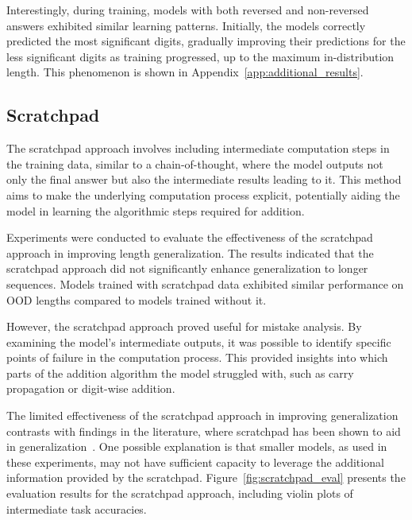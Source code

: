 Interestingly, during training, models with both reversed and non-reversed answers exhibited similar learning patterns. Initially, the models correctly predicted the most significant digits, gradually improving their predictions for the less significant digits as training progressed, up to the maximum in-distribution length. This phenomenon is shown in Appendix~\ref{app:additional_results}.

\subsection{Scratchpad}

The scratchpad approach involves including intermediate computation steps in the training data, similar to a chain-of-thought, where the model outputs not only the final answer but also the intermediate results leading to it. This method aims to make the underlying computation process explicit, potentially aiding the model in learning the algorithmic steps required for addition.

Experiments were conducted to evaluate the effectiveness of the scratchpad approach in improving length generalization. The results indicated that the scratchpad approach did not significantly enhance generalization to longer sequences. Models trained with scratchpad data exhibited similar performance on OOD lengths compared to models trained without it.

However, the scratchpad approach proved useful for mistake analysis. By examining the model's intermediate outputs, it was possible to identify specific points of failure in the computation process. This provided insights into which parts of the addition algorithm the model struggled with, such as carry propagation or digit-wise addition.

The limited effectiveness of the scratchpad approach in improving generalization contrasts with findings in the literature, where scratchpad has been shown to aid in generalization~\parencite{lee_teaching_2023}. One possible explanation is that smaller models, as used in these experiments, may not have sufficient capacity to leverage the additional information provided by the scratchpad. Figure~\ref{fig:scratchpad_eval} presents the evaluation results for the scratchpad approach, including violin plots of intermediate task accuracies.

